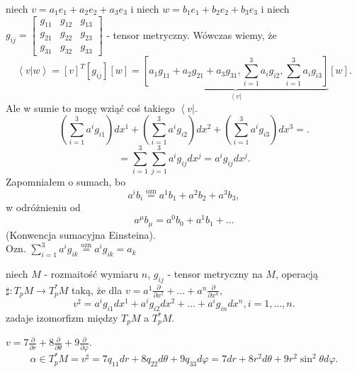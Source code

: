 \documentclass[../main.tex]{subfiles}
\begin{document}
\begin{obserwacja}
niech $v = a_1e_1 + a_2e_2 + a_3e_3$ i niech $w = b_1e_1 + b_2e_2 + b_3e_3$ i niech $g_{ij} = \begin{bmatrix} g_{11}&g_{12}&g_{13}\\ g_{21}& g_{22}&g_{23}\\ g_{31}&g_{32}&g_{33} \end{bmatrix} $ - tensor metryczny. Wówczas wiemy, że
    \[
        \left<v|w \right> = \left[v\right]^T\left[ g_{ij} \right] \left[ w \right] = \underbrace{\left[ a_1g_{11}+a_2g_{21}+a_3g_{31},\sum_{i=1}^{3}a_ig_{i2},\sum_{i=1}^3a_ig_{i3} \right]}_{\left< v\right|}\left[ w \right]
    .\]
Ale w sumie to mogę wziąć coś takiego $\left< v \right|$.\\
\[
    \left( \sum_{i=1}^3 a^ig_{i1} \right) dx^1 + \left( \sum_{i=1}^3a^ig_{i2} \right) dx^2 + \left( \sum_{i=1}^3a^ig_{i3} \right)dx^3=
.\]
\[
= \sum_{i=1}^3\sum_{j=1}^3 a^ig_{ij}dx^j = a^ig_{ij}dx^j
.\]
Zapomniałem o sumach, bo
    \[
        a^ib_i \overset{\text{ozn}}{=}  a^1b_1 + a^2b_2 + a^3b_3
    ,\]
    w odróżnieniu od
    \[
        a^{\mu}b_\mu = a^0b_0+a^1b_1+\ldots
    \] (Konwencja sumacyjna Einsteina).\\
Ozn. $\sum_{i=1}^3 a^ig_{ik} \overset{\text{ozn}}{=} a^ig_{ik} = a_k$
\end{obserwacja}
\begin{definicja}
    niech $M$ - rozmaitość wymiaru $n$, $g_{ij}$ - tensor metryczny na $M$, operacją $\sharp: T_pM \to T_p^*M$ taką, że dla $v = a^1 \frac{\partial }{\partial x^1} + \ldots + a^n \frac{\partial }{\partial x^n} $,\\
    \[
    v^{\sharp}=a^ig_{i1}dx^1 + a^ig_{i2}dx^2 + \ldots + a^ig_{in}dx^n, i=1,\ldots,n
    .\]
    zadaje izomorfizm między $T_pM$ a $T_p^*M$.
\end{definicja}
\begin{przyklad}
    $v = 7 \frac{\partial }{\partial r} + 8 \frac{\partial }{\partial \theta} + 9 \frac{\partial }{\partial \varphi}$.
    \[
    \alpha\in T_p^*M  = v^{\sharp} = 7q_{11}dr+8q_{22}d\theta + 9q_{33}d\varphi = 7dr + 8r^2d\theta + 9r^2\sin^2\theta d\varphi
    .\]
\end{przyklad}
\end{document}
